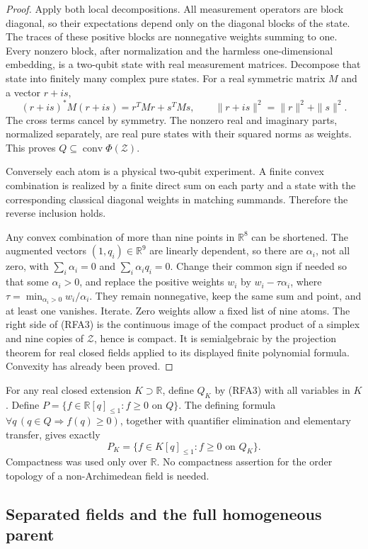 \begin{proof}
Apply both local decompositions. All measurement operators are block
diagonal, so their expectations depend only on the diagonal blocks of
the state. The traces of these positive blocks are nonnegative weights
summing to one. Every nonzero block, after normalization and the harmless
one-dimensional embedding, is a two-qubit state with real measurement
matrices. Decompose that state into finitely many complex pure states.
For a real symmetric matrix $M$ and a vector $r+is$,
\[
 (r+is)^*M(r+is)=r^TMr+s^TMs,\qquad
 \|r+is\|^2=\|r\|^2+\|s\|^2.
 \tag{RFA5}
\]
The cross terms cancel by symmetry. The nonzero real and imaginary parts,
normalized separately, are real pure states with their squared norms as
weights. This proves $Q\subseteq\operatorname{conv}\Phi(\mathcal Z)$.

Conversely each atom is a physical two-qubit experiment. A finite convex
combination is realized by a finite direct sum on each party and a state
with the corresponding classical diagonal weights in matching summands.
Therefore the reverse inclusion holds.

Any convex combination of more than nine points in $\mathbb R^8$ can be
shortened. The augmented vectors $(1,q_i)\in\mathbb R^9$ are linearly
dependent, so there are $\alpha_i$, not all zero, with
$\sum_i\alpha_i=0$ and $\sum_i\alpha_iq_i=0$. Change their common sign if
needed so that some $\alpha_i>0$, and replace the positive weights $w_i$
by $w_i-\tau\alpha_i$, where
$\tau=\min_{\alpha_i>0}w_i/\alpha_i$. They remain nonnegative, keep the
same sum and point, and at least one vanishes. Iterate. Zero weights
allow a fixed list of nine atoms. The right side of (RFA3) is the
continuous image of the compact product of a simplex and nine copies of
$\mathcal Z$, hence is compact. It is semialgebraic by the projection
theorem for real closed fields applied to its displayed finite polynomial
formula. Convexity has already been proved.
\end{proof}

For any real closed extension $K\supset\mathbb R$, define $Q_K$ by
(RFA3) with all variables in $K$. Define
$P=\{f\in\mathbb R[q]_{\leq1}:f\geq0\text{ on }Q\}$.
The defining formula
$\forall q\,(q\in Q\Rightarrow f(q)\geq0)$, together with quantifier
elimination and elementary transfer, gives exactly
\[
 P_K=\{f\in K[q]_{\leq1}:f\geq0\text{ on }Q_K\}.
 \tag{RFA6}
\]
Compactness was used only over $\mathbb R$. No compactness assertion for
the order topology of a non-Archimedean field is needed.

\subsection{Separated fields and the full homogeneous parent}

